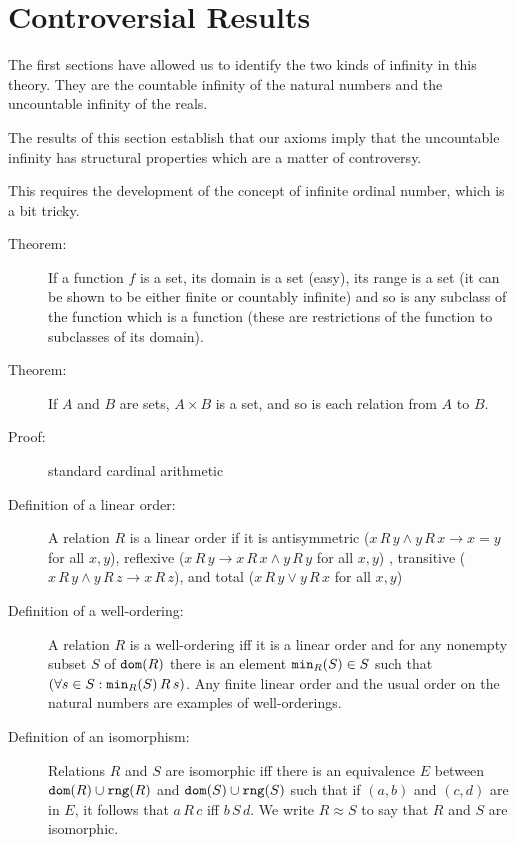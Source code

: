 \documentclass[12pt]{article}
\begin{document}
\section{Controversial Results}

The first sections have allowed us to identify the two kinds of infinity in this theory.  They are the countable infinity of the natural numbers and the uncountable infinity of the reals.

The results of this section establish that our axioms imply that the uncountable infinity has structural properties which are a matter of controversy.

This requires the development of the concept of infinite ordinal number, which is a bit tricky.

\begin{description}



\item[Theorem:]  If a function $f$ is a set, its domain is a set (easy), its range is a set (it can be shown to be either finite or countably infinite) and so is any subclass of the function which is a function (these are restrictions of the function to subclasses of its domain).



\item[Theorem:]  If $A$ and $B$ are sets, $A \times B$ is a set, and so is each relation from $A$ to $B$.

\item[Proof:]  standard cardinal arithmetic

\item[Definition of a linear order:]  A relation $R$ is a linear order if it is antisymmetric ($x \, R \, y \wedge y \, R \, x \rightarrow x=y$  for all $x,y$), reflexive ($x \, R \, y \rightarrow x \, R \, x \wedge y \, R \, y$ for all $x,y$) , transitive ($x\, R \, y \wedge y \, R \, z \rightarrow x \, R \, z$), and total ($x\, R \, y \vee y \,R\, x$ for all $x,y$)

\item[Definition of a well-ordering:]  A relation $R$ is a well-ordering iff it is a linear order and for any nonempty subset $S$ of ${\tt dom}(R)$ there is an element ${\tt min}_R(S)\in S$ such that $(\forall s \in S:{\tt min}_R(S) \, R \, s)$.  Any finite linear order and the usual order on the natural numbers are examples of well-orderings.

\item[Definition of an isomorphism:]  Relations $R$ and $S$ are isomorphic iff there is an equivalence $E$ between ${\tt dom}(R) \cup {\tt rng}(R)$ and ${\tt dom}(S) \cup {\tt rng}(S)$ such that if $(a,b)$ and $(c,d)$ are in $E$, it follows that $a \, R \, c$ iff $b \, S \, d$.  We write $R \approx S$  to say that $R$ and $S$ are isomorphic.


\end{description}
\end{document}

